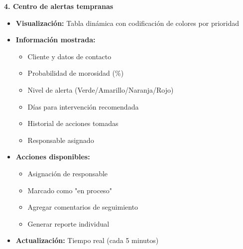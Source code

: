 \textbf{4. Centro de alertas tempranas}
\begin{itemize}
    \item \textbf{Visualización:} Tabla dinámica con codificación de colores por prioridad
    \item \textbf{Información mostrada:}
    \begin{itemize}
        \item Cliente y datos de contacto
        \item Probabilidad de morosidad (\%)
        \item Nivel de alerta (Verde/Amarillo/Naranja/Rojo)
        \item Días para intervención recomendada
        \item Historial de acciones tomadas
        \item Responsable asignado
    \end{itemize}
    \item \textbf{Acciones disponibles:}
    \begin{itemize}
        \item Asignación de responsable
        \item Marcado como "en proceso"
        \item Agregar comentarios de seguimiento
        \item Generar reporte individual
    \end{itemize}
    \item \textbf{Actualización:} Tiempo real (cada 5 minutos)
\end{itemize}

